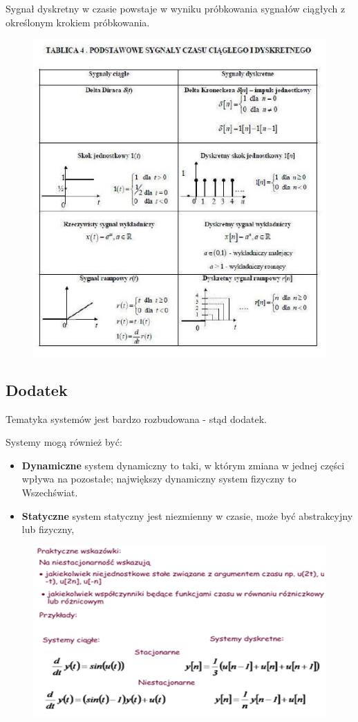 \documentclass[a4paper,twoside]{report}
\begin{document}
Sygnał dyskretny w  czasie powstaje w wyniku próbkowania sygnałów ciągłych z określonym krokiem próbkowania.

\begin{figure}[htbp]
\centering
\includegraphics[scale=0.9]{obrazy/podstawowe_sygnaly.png}
\end{figure}

\subsection{Dodatek}
Tematyka systemów jest bardzo rozbudowana - stąd dodatek.

Systemy mogą również być:
\begin{itemize}
\item \textbf{Dynamiczne}
system dynamiczny to taki, w którym zmiana w jednej części wpływa na pozostałe; największy dynamiczny system fizyczny to Wszechświat.
\item \textbf{Statyczne}
system statyczny jest niezmienny w czasie, może być abstrakcyjny lub fizyczny,
\end{itemize}


\begin{figure}[htbp]
\centering
\includegraphics[scale=0.8]{obrazy/slajd.png}
\end{figure}
\end{document}
